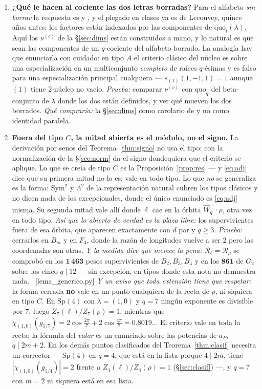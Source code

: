 \documentclass[11pt,a4paper]{article}
\newcommand{\Sp}{\mathrm{Sp}}
\newcommand{\ver}[1]{\unskip\penalty0\ \textcolor{azul}{\small\textsf{[#1]}}}
\begin{document}
\begin{enumerate}
\item \textbf{¿Qué le hacen al cociente las dos letras borradas?}
Para el alfabeto \emph{sin borrar} la respuesta es \cite{Lec07a} y \cite{AK22}, y el plegado en
clases ya es de Lecouvey, quince años antes: los factores están indexados por las
componentes de $\mathrm{quo}_t(\lambda)$. Aquí los $\nu^{(c)}$ de la \S\ref{sec:dims} están
construidos a mano, y lo natural es que sean las componentes de un $q$-cociente del alfabeto
borrado. La analogía hay que enunciarla con cuidado: en tipo $A$ el criterio clásico del núcleo es
sobre una especialización en un multiconjunto \emph{completo} de raíces $q$-ésimas y es falso para
una especialización principal cualquiera --- $s_{(1)}(1,-1,1)=1$ aunque $(1)$ tiene $2$-núcleo no
vacío. \emph{Prueba:} comparar $\nu^{(c)}$ con $\mathrm{quo}_q$ del beta-conjunto de $\lambda$ donde
los dos están definidos, y ver qué mueven los dos borrados. \emph{Qué compraría:} la
\S\ref{sec:dims} como corolario de \cite{AK22} y no como identidad paralela.

\item \textbf{Fuera del tipo $C$, la mitad abierta es el módulo, no el signo.}
La derivación por senos del Teorema~\ref{thm:signo} no usa el tipo: con la normalización de la
\S\ref{sec:norm} da el signo dondequiera que el criterio se aplique. Lo que se creía de tipo $C$ es
la Proposición~\ref{prop:res} --- y \eqref{eq:adj} dice que su primera mitad no lo es: vale en
todo tipo. Lo que \emph{no} se generaliza es la forma: $\mathrm{Sym}^2$ y $\Lambda^2$ de la
representación natural cubren los tipos clásicos y no dicen nada de los excepcionales, donde el
único enunciado es \eqref{eq:adj} misma. Su segunda mitad vale allí
donde $\ell$ cae en la órbita $\widehat W_q^{+}\!\cdot\rho$, otra vez en todo tipo. \emph{Así que lo
abierto de verdad es la plaza libre:} los supervivientes fuera de esa órbita, que aparecen
exactamente con $d$ par y $q\ge3$. \emph{Prueba:} cerrarlos en $B_m$ y en $F_4$, donde la razón de
longitudes vuelve a ser $2$ pero las coordenadas son otras. \emph{Y la medida dice que merece la
pena:} $\mathscr{R}_\ell=\mathscr{R}_\rho$ se comprobó en los $\mathbf{1\,463}$ pesos supervivientes
de $B_2,B_3,B_4$ y en los $\mathbf{861}$ de $G_2$ sobre los cinco $q\mid12$ --- sin excepción, en
tipos donde esta nota no demuestra nada. \ver{lema\_generico.py} \emph{Y un aviso que toda extensión tiene que respetar:} la forma cerrada
\textbf{no} vale en un punto cualquiera de la recta de $\rho$, ni siquiera en tipo $C$. En $\Sp(4)$
con $\lambda=(1,0)$ y $q=7$ ningún exponente es divisible por $7$, luego $Z_7(\ell)/Z_7(\rho)=1$,
mientras que $\chi_{(1,0)}(g_{1/7})=2\cos\frac{2\pi}{7}+2\cos\frac{4\pi}{7}=0.8019\ldots$ El
criterio vale en toda la recta; la fórmula del \emph{valor} es un enunciado sobre las potencias
de $a_P$, $q\mid 2m+2$. En los demás puntos clasificados del Teorema~\ref{thm:clasif} necesita un
corrector --- $\Sp(4)$ en $q=4$, que está en la lista porque $4\mid 2m$, tiene
$|\chi_{(1,0)}(g_{1/4})|=2$ frente a $Z_4(\ell)/Z_4(\rho)=1$ (\S\ref{sec:clasif}) ---, y $q=7$ con
$m=2$ ni siquiera está en esa lista.


\end{enumerate}
\end{document}
